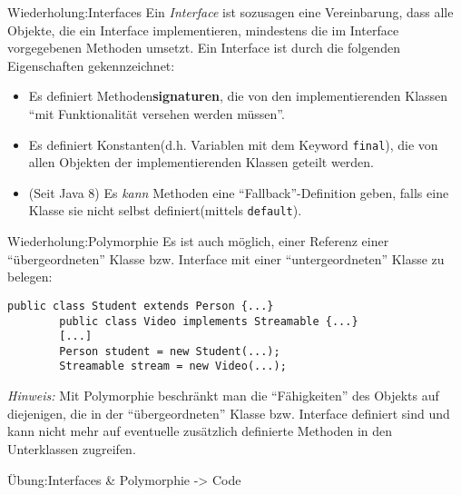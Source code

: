 \begin{frame}{Wiederholung:Interfaces}
    Ein \textit{Interface} ist sozusagen eine Vereinbarung, dass alle Objekte, die ein Interface implementieren, 
    mindestens die im Interface vorgegebenen Methoden umsetzt. Ein Interface ist durch die folgenden Eigenschaften gekennzeichnet:
    \begin{itemize}[<+->]
        \item Es definiert Methoden\textbf{signaturen}, die von den implementierenden Klassen \enquote{mit Funktionalität versehen werden müssen}.
        \item Es definiert Konstanten(d.h. Variablen mit dem Keyword \texttt{final}), die von allen Objekten der implementierenden Klassen geteilt werden.
        \item (Seit Java 8) Es \emph{kann} Methoden eine \enquote{Fallback}-Definition geben, falls eine Klasse sie nicht selbst definiert(mittels \texttt{default}).
    \end{itemize}
\end{frame}

\begin{frame}[fragile]{Wiederholung:Polymorphie}
    Es ist auch möglich, einer Referenz einer \enquote{übergeordneten} Klasse bzw. Interface mit einer \enquote{untergeordneten} Klasse zu belegen: 
    \begin{lstlisting}[gobble=8]
        public class Student extends Person {...}
        public class Video implements Streamable {...}
        [...]
        Person student = new Student(...);
        Streamable stream = new Video(...);
    \end{lstlisting}
    \textit{Hinweis:} Mit Polymorphie beschränkt man die \enquote{Fähigkeiten} des Objekts auf diejenigen, 
    die in der \enquote{übergeordneten} Klasse bzw. Interface definiert sind 
    und kann nicht mehr auf eventuelle zusätzlich definierte Methoden in den Unterklassen zugreifen.
\end{frame}

\begin{frame}{Übung:Interfaces \& Polymorphie}
    -> Code
\end{frame}


